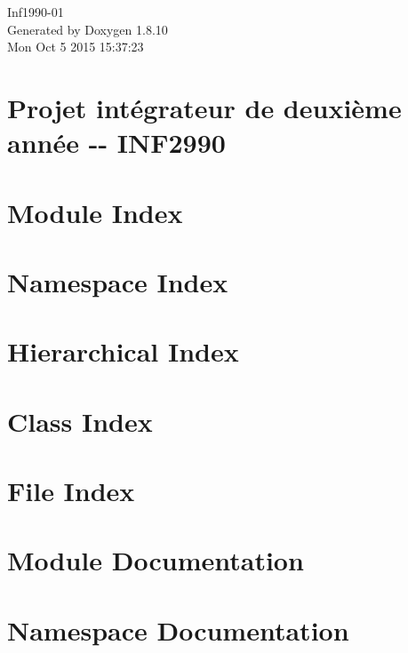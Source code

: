 \documentclass[twoside]{book}
\newcommand{\+}{\discretionary{\mbox{\scriptsize$\hookleftarrow$}}{}{}}
\newcommand{\clearemptydoublepage}{%
  \newpage{\pagestyle{empty}\cleardoublepage}%
}
\begin{document}
\hypersetup{pageanchor=false,
             bookmarks=true,
             bookmarksnumbered=true,
             pdfencoding=unicode
            }
\begin{titlepage}
\vspace*{7cm}
\begin{center}%
{\Large Inf1990-\/01 }\\
\vspace*{1cm}
{\large Generated by Doxygen 1.8.10}\\
\vspace*{0.5cm}
{\small Mon Oct 5 2015 15:37:23}\\
\end{center}
\end{titlepage}
\clearemptydoublepage
\tableofcontents
\clearemptydoublepage
{}
\hypersetup{pageanchor=true}

\chapter{Projet intégrateur de deuxième année -\/-\/ I\+N\+F2990}
\label{index}\hypertarget{index}{}
\chapter{Module Index}

\chapter{Namespace Index}

\chapter{Hierarchical Index}

\chapter{Class Index}

\chapter{File Index}

\chapter{Module Documentation}





\chapter{Namespace Documentation}






\end{document}
